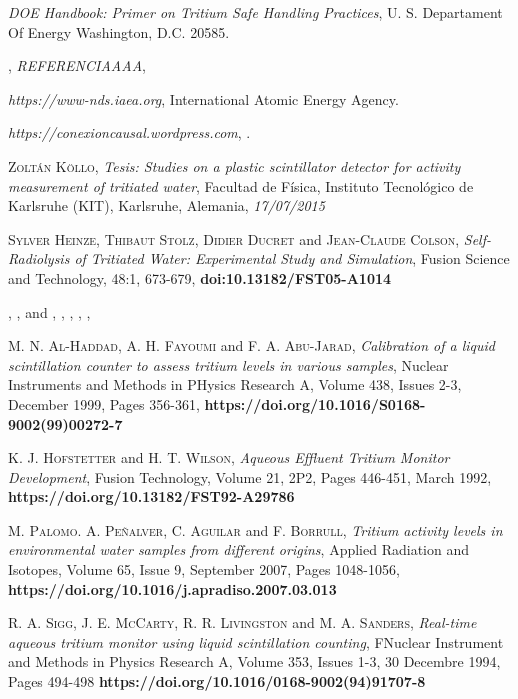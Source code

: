 \begin{thebibliography}{100}
\textit{DOE Handbook: Primer on Tritium Safe Handling Practices}, U. S. Departament Of Energy Washington, D.C. 20585.

 \textsc{},
\textit{REFERENCIAAAA}, \textbf{}

\textit{https://www-nds.iaea.org}, International Atomic Energy Agency.

\textit{https://conexioncausal.wordpress.com}, .

 \textsc{Zoltán Köllo},
\textit{Tesis: Studies on a plastic scintillator detector for activity measurement of tritiated water}, Facultad de Física, Instituto Tecnológico de Karlsruhe (KIT), Karlsruhe, Alemania, \textit{17/07/2015}

 \textsc{Sylver Heinze}, \textsc{Thibaut Stolz}, \textsc{Didier Ducret} and \textsc{Jean-Claude Colson},
\textit{Self-Radiolysis of Tritiated Water: Experimental Study and Simulation}, Fusion Science and Technology, 48:1, 673-679, \textbf{doi:10.13182/FST05-A1014}

 \textsc{}, \textsc{}, \textsc{} and \textsc{},
\textit{}, , , , \textbf{}

 \textsc{M. N. Al-Haddad}, \textsc{A. H. Fayoumi} and \textsc{F. A. Abu-Jarad},
\textit{Calibration of a liquid scintillation counter to assess tritium levels in various samples}, Nuclear Instruments and Methods in PHysics Research A, Volume 438, Issues 2-3, December 1999, Pages 356-361, \textbf{https://doi.org/10.1016/S0168-9002(99)00272-7}

 \textsc{K. J. Hofstetter} and \textsc{H. T. Wilson},
\textit{Aqueous Effluent Tritium Monitor Development}, Fusion Technology, Volume 21, 2P2, Pages 446-451, March 1992, \textbf{https://doi.org/10.13182/FST92-A29786}


 \textsc{M. Palomo}. \textsc{A. Peñalver}, \textsc{C. Aguilar} and \textsc{F. Borrull},
\textit{Tritium activity levels in environmental water samples from different origins}, Applied Radiation and Isotopes, Volume 65, Issue 9, September 2007, Pages 1048-1056, \textbf{https://doi.org/10.1016/j.apradiso.2007.03.013}

 \textsc{R. A. Sigg}, \textsc{J. E. McCarty}, \textsc{R. R. Livingston} and \textsc{M. A. Sanders},
\textit{Real-time aqueous tritium monitor using liquid scintillation counting}, FNuclear Instrument and Methods in Physics Research A, Volume 353, Issues 1-3, 30 Decembre 1994, Pages 494-498 \textbf{https://doi.org/10.1016/0168-9002(94)91707-8}



\end{thebibliography}
